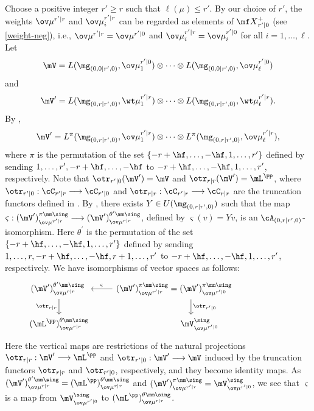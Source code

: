 \documentclass[11pt, reqno]{amsart}
\theoremstyle{definition}
\theoremstyle{remark}
\numberwithin{equation}{section}
\begin{document}
Choose a positive integer $r' \ge r$ such that $\ell(\mu) \le r'$.
By our choice of $r'$, the weights $\ov\mu^{r'|r}$ and $\ov\mu_{i}^{r'|r}$ can be regarded as elements of ${\mf X}_{r'|0}^+$ (see \eqref{weight-neg}),
i.e., $\ov\mu^{r'|r}=\ov\mu^{r'|0}$ and $\ov\mu_{i}^{r'|r}=\ov\mu_{i}^{r'|0}$ for all $i=1, \ldots, \ell$.
Let
$$
\mV= L(\mg_{(0,0|r',0)},\ov\mu_1^{r'|0}) \otimes \cdots \otimes L(\mg_{(0,0|r',0)},\ov\mu_\ell^{r'|0})
$$
and
$$
\mV^\prime=L(\mg_{(0,r|r',0)},\wt\mu_1^{r'|r})  \otimes \cdots \otimes L(\mg_{(0,r|r',0)},\wt\mu_\ell^{r'|r}).
$$
By \cite[Theorem 2.55]{CW},
$$
\mV^\prime=L^{\pi}(\mg_{(0,r|r',0)},\ov\mu_1^{r'|r})  \otimes \cdots \otimes L^{\pi}(\mg_{(0,r|r',0)},\ov\mu_\ell^{r'|r}),
$$
where $\pi$ is the permutation of the set $\{-r+\hf, \ldots, -\hf, 1, \ldots, r'\}$ defined by sending $1, \ldots, r', -r+\hf, \ldots, -\hf$ to $-r+\hf, \ldots, -\hf, 1, \ldots, r'$, respectively.
%
Note that $\otr_{r'|0}(\mV^\prime)= \mV$ and $\otr_{r|r}(\mV^\prime)=\mL^\pp$, where $\otr_{r'|0}: \cC_{r'|r} \longrightarrow \cC_{r'|0}$ and $\otr_{r|r}:\cC_{r'|r} \longrightarrow \cC_{r|r}$ are the truncation functors defined in \cite[Section 3.3]{ChL25}.
%
By \cite[Proposition 3.14]{ChL25}, there exists $Y \in U(\mg_{(0,r|r',0)})$ such that the map $\varsigma: (\mV^\prime)^{\pi\mm\sing}_{\ov\mu^{r'|r}} \longrightarrow (\mV^\prime)^{\theta^\prime\mm\sing}_{\ov\mu^{r|r}}$, defined by $\varsigma (v) =  Y v$, is an $\cA_{(0,r|r',0)}$-isomorphism.
Here $\theta^\prime$ is the permutation of the set $\{-r+\hf, \ldots, -\hf, 1, \ldots, r'\}$ defined by sending $1, \ldots, r, -r+\hf, \ldots, -\hf, r+1, \ldots, r'$ to $-r+\hf, \ldots, -\hf, 1, \ldots, r'$, respectively.
We have isomorphisms of vector spaces as follows:
$$
\begin{tikzcd}
(\mV^\prime)^{\theta^\prime\mm\sing}_{\ov\mu^{r|r}}\ \arrow[d,swap, "\otr_{r|r}"]
&(\mV^\prime)^{\pi\mm\sing}_{\ov\mu^{r'|r}}=(\mV^\prime)^{\pi\mm\sing}_{\ov\mu^{r'|0}}\arrow[l,swap," \varsigma "]  \arrow[d,"\otr_{r'|0}"] \qquad \qquad    &\\
(\mL^\pp)^{\theta\mm\sing}_{\ov\mu^{r|r}} &\qquad\mV^\sing_{\ov\mu^{r'|0}}&
\end{tikzcd}
$$
Here the vertical maps are restrictions of the natural projections $\otr_{r|r}: \mV^\prime \longrightarrow \mL^\pp$ and $\otr_{r'|0}: \mV^\prime \longrightarrow \mV$ induced by the truncation functors $\otr_{r|r}$ and $\otr_{r'|0}$, respectively, and they become identity maps.
As $(\mV^\prime)^{\theta^\prime\mm\sing}_{\ov\mu^{r|r}}=(\mL^\pp)^{\theta\mm\sing}_{\ov\mu^{r|r}}$ and $(\mV^\prime)^{\pi\mm\sing}_{\ov\mu^{r'|r}}=\mV^\sing_{\ov\mu^{r'|0}}$,
we see that $\varsigma$ is a map from $\mV^\sing_{\ov\mu^{r'|0}}$ to $(\mL^\pp)^{\theta\mm\sing}_{\ov\mu^{r|r}}$.
\end{document}
